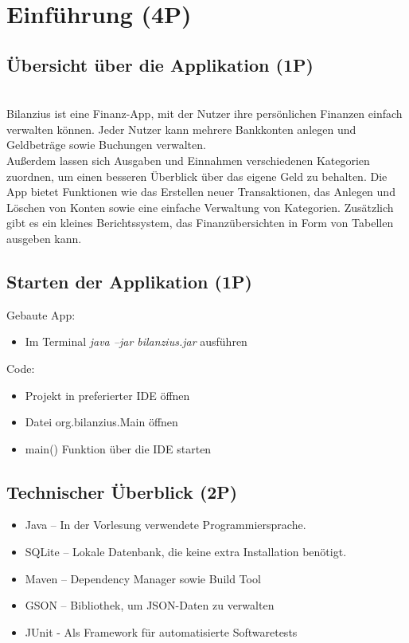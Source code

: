 \section{Einführung (4P)}

\subsection{Übersicht über die Applikation (1P)}
\\
Bilanzius ist eine Finanz-App, mit der Nutzer ihre persönlichen Finanzen einfach verwalten können.
Jeder Nutzer kann mehrere Bankkonten anlegen und Geldbeträge sowie Buchungen verwalten.
\\
Außerdem lassen sich Ausgaben und Einnahmen verschiedenen Kategorien zuordnen, um einen besseren Überblick über das eigene Geld zu behalten.
Die App bietet Funktionen wie das Erstellen neuer Transaktionen, das Anlegen und Löschen von Konten sowie eine einfache Verwaltung von Kategorien.
Zusätzlich gibt es ein kleines Berichtssystem, das Finanzübersichten in Form von Tabellen ausgeben kann.

\subsection{Starten der Applikation (1P)}
Gebaute App:  
\begin{itemize}
    \item Im Terminal \textit{java –jar bilanzius.jar} ausführen
\end{itemize}
Code: 
\begin{itemize}
    \item Projekt in preferierter IDE öffnen
    \item Datei org.bilanzius.Main öffnen
    \item main() Funktion über die IDE starten
\end{itemize}

\subsection{Technischer Überblick (2P)}
\begin{itemize}
    \item Java – In der Vorlesung verwendete Programmiersprache.
    \item SQLite – Lokale Datenbank, die keine extra Installation benötigt.
    \item Maven – Dependency Manager sowie Build Tool
    \item GSON – Bibliothek, um JSON-Daten zu verwalten
    \item JUnit - Als Framework für automatisierte Softwaretests
\end{itemize}